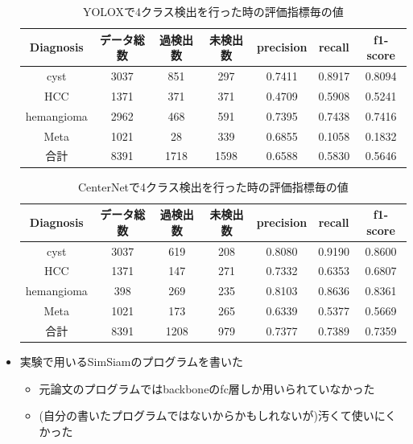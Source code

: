 \documentclass[a4j]{ujarticle}
\begin{document}
\begin{itemize}
            \begin{table}[!h]
                \centering
                \caption{YOLOX\cite{yolox}で4クラス検出を行った時の評価指標毎の値}
                \label{tab:metric_yolox}
                \begin{tabular}{c|ccc|ccc}
                    Diagnosis & データ総数 & 過検出数 & 未検出数 & precision & recall & f1-score \\ \hline
                    cyst & 3037 & 851 & 297 & 0.7411 & 0.8917 & 0.8094 \\
                    HCC & 1371 & 371 & 371 & 0.4709 & 0.5908 & 0.5241 \\
                    hemangioma & 2962 & 468 & 591 & 0.7395 & 0.7438 & 0.7416 \\
                    Meta & 1021 & 28 & 339 & 0.6855 & 0.1058 & 0.1832 \\ \hline
                    合計 & 8391 & 1718 & 1598 & 0.6588 & 0.5830 & 0.5646
                \end{tabular}
            \end{table}

            \begin{table}[!h]
                \centering
                \caption{CenterNet\cite{centernet}で4クラス検出を行った時の評価指標毎の値}
                \label{tab:metric_center}
                \begin{tabular}{c|ccc|ccc}
                    Diagnosis & データ総数 & 過検出数 & 未検出数 & precision & recall & f1-score \\ \hline
                    cyst & 3037 & 619 & 208 & 0.8080 & 0.9190 & 0.8600 \\
                    HCC & 1371 & 147 & 271 & 0.7332 & 0.6353 & 0.6807 \\
                    hemangioma & 398 & 269 & 235 & 0.8103 & 0.8636 & 0.8361 \\
                    Meta & 1021 & 173 & 265 & 0.6339 & 0.5377 & 0.5669 \\ \hline
                    合計 & 8391 & 1208 & 979 & 0.7377 & 0.7389 & 0.7359
                \end{tabular}
            \end{table}

            \item 実験で用いるSimSiam\cite{simsiam}のプログラムを書いた
            \begin{itemize}
                \item 元論文のプログラムではbackboneのfc層しか用いられていなかった
                \item (自分の書いたプログラムではないからかもしれないが)汚くて使いにくかった
            \end{itemize}
        \end{itemize}
\end{document}
